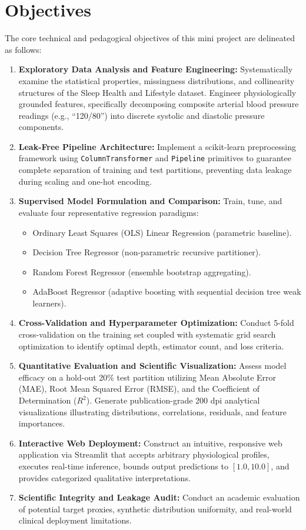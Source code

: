 \documentclass[12pt,a4paper]{article}
\begin{document}
\section{Objectives}
The core technical and pedagogical objectives of this mini project are delineated as follows:
\begin{enumerate}
    \item \textbf{Exploratory Data Analysis and Feature Engineering:} Systematically examine the statistical properties, missingness distributions, and collinearity structures of the Sleep Health and Lifestyle dataset. Engineer physiologically grounded features, specifically decomposing composite arterial blood pressure readings (e.g., ``120/80'') into discrete systolic and diastolic pressure components.
    \item \textbf{Leak-Free Pipeline Architecture:} Implement a scikit-learn preprocessing framework using \texttt{ColumnTransformer} and \texttt{Pipeline} primitives to guarantee complete separation of training and test partitions, preventing data leakage during scaling and one-hot encoding.
    \item \textbf{Supervised Model Formulation and Comparison:} Train, tune, and evaluate four representative regression paradigms:
    \begin{itemize}
        \item Ordinary Least Squares (OLS) Linear Regression (parametric baseline).
        \item Decision Tree Regressor (non-parametric recursive partitioner).
        \item Random Forest Regressor (ensemble bootstrap aggregating).
        \item AdaBoost Regressor (adaptive boosting with sequential decision tree weak learners).
    \end{itemize}
    \item \textbf{Cross-Validation and Hyperparameter Optimization:} Conduct 5-fold cross-validation on the training set coupled with systematic grid search optimization to identify optimal depth, estimator count, and loss criteria.
    \item \textbf{Quantitative Evaluation and Scientific Visualization:} Assess model efficacy on a hold-out 20\% test partition utilizing Mean Absolute Error (MAE), Root Mean Squared Error (RMSE), and the Coefficient of Determination ($R^2$). Generate publication-grade 200 dpi analytical visualizations illustrating distributions, correlations, residuals, and feature importances.
    \item \textbf{Interactive Web Deployment:} Construct an intuitive, responsive web application via Streamlit that accepts arbitrary physiological profiles, executes real-time inference, bounds output predictions to $[1.0, 10.0]$, and provides categorized qualitative interpretations.
    \item \textbf{Scientific Integrity and Leakage Audit:} Conduct an academic evaluation of potential target proxies, synthetic distribution uniformity, and real-world clinical deployment limitations.
\end{enumerate}
\end{document}
